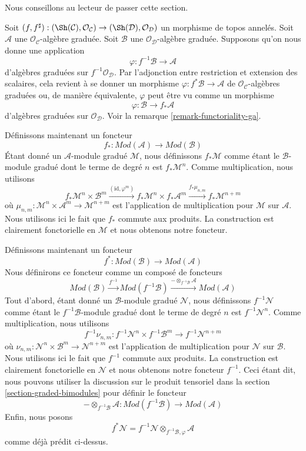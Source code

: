 \noindent
Nous conseillons au lecteur de passer cette section.

\medskip\noindent
Soit $(f, f^\sharp) : (\Sh(\mathcal{C}), \mathcal{O}_\mathcal{C}) \to (\Sh(\mathcal{D}), \mathcal{O}_\mathcal{D})$ un morphisme de topos annelés.
Soit $\mathcal{A}$ une $\mathcal{O}_\mathcal{C}$-algèbre graduée.
Soit $\mathcal{B}$ une $\mathcal{O}_\mathcal{D}$-algèbre graduée.
Supposons qu'on nous donne une application
$$
\varphi : f^{-1}\mathcal{B} \to \mathcal{A}
$$
d'algèbres graduées sur $f^{-1}\mathcal{O}_\mathcal{D}$.
Par l'adjonction entre restriction et extension des scalaires, cela revient à se donner un morphisme $\varphi : f^*\mathcal{B} \to \mathcal{A}$ de $\mathcal{O}_\mathcal{C}$-algèbres graduées ou, de manière équivalente, $\varphi$ peut être vu comme un morphisme
$$
\varphi : \mathcal{B} \to f_*\mathcal{A}
$$
d'algèbres graduées sur $\mathcal{O}_\mathcal{D}$.
Voir la remarque \ref{remark-functoriality-ga}.

\medskip\noindent
Définissons maintenant un foncteur
$$
f_* :
\textit{Mod}(\mathcal{A})
\longrightarrow
\textit{Mod}(\mathcal{B})
$$
Étant donné un $\mathcal{A}$-module gradué $\mathcal{M}$, nous définissons $f_*\mathcal{M}$ comme étant le $\mathcal{B}$-module gradué dont le terme de degré $n$ est $f_*\mathcal{M}^n$.
Comme multiplication, nous utilisons
$$
f_*\mathcal{M}^n \times \mathcal{B}^m
\xrightarrow{(\text{id}, \varphi^m)}
f_*\mathcal{M}^n \times f_*\mathcal{A}^m
\xrightarrow{f_*\mu_{n, m}}
f_*\mathcal{M}^{n + m}
$$
où $\mu_{n, m} : \mathcal{M}^n \times \mathcal{A}^m \to \mathcal{M}^{n + m}$ est l'application de multiplication pour $\mathcal{M}$ sur $\mathcal{A}$.
Nous utilisons ici le fait que $f_*$ commute aux produits.
La construction est clairement fonctorielle en $\mathcal{M}$ et nous obtenons notre foncteur.

\medskip\noindent
Définissons maintenant un foncteur
$$
f^* :
\textit{Mod}(\mathcal{B})
\longrightarrow
\textit{Mod}(\mathcal{A})
$$
Nous définirons ce foncteur comme un composé de foncteurs
$$
\textit{Mod}(\mathcal{B})
\xrightarrow{f^{-1}}
\textit{Mod}(f^{-1}\mathcal{B})
\xrightarrow{ - \otimes_{f^{-1}\mathcal{B}} \mathcal{A}}
\textit{Mod}(\mathcal{A})
$$
Tout d'abord, étant donné un $\mathcal{B}$-module gradué $\mathcal{N}$, nous définissons $f^{-1}\mathcal{N}$ comme étant le $f^{-1}\mathcal{B}$-module gradué dont le terme de degré $n$ est $f^{-1}\mathcal{N}^n$.
Comme multiplication, nous utilisons
$$
f^{-1}\nu_{n, m} :
f^{-1}\mathcal{N}^n \times f^{-1}\mathcal{B}^m
\longrightarrow
f^{-1}\mathcal{N}^{n + m}
$$
où $\nu_{n, m} : \mathcal{N}^n \times \mathcal{B}^m \to \mathcal{N}^{n + m}$ est l'application de multiplication pour $\mathcal{N}$ sur $\mathcal{B}$.
Nous utilisons ici le fait que $f^{-1}$ commute aux produits.
La construction est clairement fonctorielle en $\mathcal{N}$ et nous obtenons notre foncteur $f^{-1}$.
Ceci étant dit, nous pouvons utiliser la discussion sur le produit tensoriel dans la section \ref{section-graded-bimodules}  pour définir le foncteur
$$
- \otimes_{f^{-1}\mathcal{B}} \mathcal{A} :
\textit{Mod}(f^{-1}\mathcal{B})
\longrightarrow
\textit{Mod}(\mathcal{A})
$$
Enfin, nous posons
$$
f^*\mathcal{N} =
f^{-1}\mathcal{N} \otimes_{f^{-1}\mathcal{B}, \varphi} \mathcal{A}
$$
comme déjà prédit ci-dessus.

